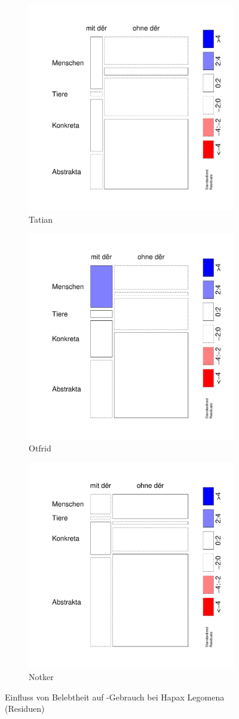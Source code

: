 \begin{figure}
\begin{subfigure}[b]{.5\linewidth}
  \includegraphics[width=6 cm]{generated/images/bel-hapaxe-residuals-T}
\caption {Tatian}
\end{subfigure}%
\begin{subfigure}[b]{.5\linewidth}
  \includegraphics[width=6 cm]{generated/images/bel-hapaxe-residuals-O}
\caption {Otfrid}
\end{subfigure}

\begin{subfigure}[b]{.5\linewidth}
  \includegraphics[width=6 cm]{generated/images/bel-hapaxe-residuals-N}
\caption {Notker}
\end{subfigure}
\caption{Einfluss von Belebtheit auf -Gebrauch bei Hapax Legomena (Residuen)}
\label{fig:bel-hapaxe-residuals}
\end{figure}

